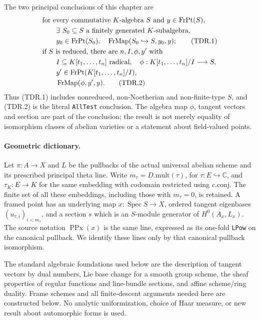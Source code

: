 \documentclass[11pt,a4paper]{article}
\numberwithin{equation}{section}
\theoremstyle{remark}\newtheorem{remark}[theorem]{Remark}
\begin{document}
The two principal conclusions of this chapter are
\begin{align}
 &\text{for every commutative }K\text{-algebra }S
   \text{ and }y\in\operatorname{FrPt}(S),\notag\\
 &\qquad\exists\ S_0\subseteq S\text{ a finitely generated }K
       \text{-subalgebra},\notag\\
 &\qquad y_0\in\operatorname{FrPt}(S_0),\quad
       \operatorname{FrMap}(S_0\hookrightarrow S,y_0,y);       \tag{TDR.1}\\
 &\text{if }S\text{ is reduced, there are }n,I,\phi,y'\text{ with}\notag\\
 &\qquad I\subseteq K[t_1,\ldots,t_n]\text{ radical},\quad
       \phi:K[t_1,\ldots,t_n]/I\longrightarrow S,\notag\\
 &\qquad y'\in\operatorname{FrPt}(K[t_1,\ldots,t_n]/I),\notag\\
 &\qquad
       \operatorname{FrMap}(\phi,y',y).                       \tag{TDR.2}
\end{align}
Thus (TDR.1) includes nonreduced, non-Noetherian and non-finite-type
\(S\), and (TDR.2) is the literal \texttt{All\allowbreak Test} conclusion.
The algebra map \(\phi\), tangent vectors and section are part of the
conclusion; the result is not merely equality of isomorphism classes
of abelian varieties or a statement about field-valued points.

\paragraph{Geometric dictionary.}
Let \(\pi:A\to X\) and \(L\) be the pullbacks of the actual universal
abelian scheme and its prescribed principal theta line.  Write
\(m_\tau=D.\mathrm{mult}(\tau)\), for
\(\tau:E\hookrightarrow\mathbb C\), and
\(\tau_K:E\to K\) for the same embedding with codomain restricted
using \(c.\mathrm{conj}\).  The finite set of all these embeddings,
including those with \(m_\tau=0\), is retained.  A framed point has an
underlying map \(x:\operatorname{Spec}S\to X\), ordered tangent
eigenbases \((u_{\tau,i})_{i<m_\tau}\), and a section \(s\) which is
an \(S\)-module generator of \(H^0(A_x,L_x)\).  The source notation
\(\operatorname{PPx}(x)\) is the same line, expressed as its
one-fold \texttt{LPow} on the canonical pullback.  We identify these
lines only by that canonical pullback isomorphism.

The standard algebraic foundations used below are the description of
tangent vectors by dual numbers, Lie base change for a smooth group
scheme, the sheaf properties of regular functions and line-bundle
sections, and affine scheme/ring duality.  Frame schemes and all
finite-descent arguments needed here are constructed below.  No
analytic uniformization, choice of Haar measure, or new result about
automorphic forms is used.
\end{document}
